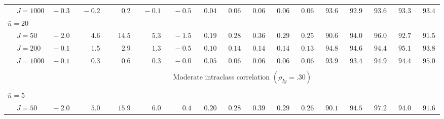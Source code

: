 \begin{sidewaystable}
\begin{threeparttable}
\begin{tabular}{llccccccccccccccc}
 & \nopagebreak $\;J=1000$  & $\phantom{0}{-}0.3\phantom{0}$ & $\phantom{0}{-}0.2\phantom{0}$ & $\phantom{0}\phantom{-}0.2\phantom{0}$ & $\phantom{0}{-}0.1\phantom{0}$ & $\phantom{0}{-}0.5\phantom{0}$ & $\phantom{0}0.04\phantom{0}$ & $\phantom{0}0.06\phantom{0}$ & $\phantom{0}0.06\phantom{0}$ & $\phantom{0}0.06\phantom{0}$ & $\phantom{0}0.06\phantom{0}$ & $\phantom{0}93.6\phantom{0}$ & $\phantom{0}92.9\phantom{0}$ & $\phantom{0}93.6\phantom{0}$ & $\phantom{0}93.3\phantom{0}$ & $\phantom{0}93.4\phantom{0}$ \\
\multicolumn{4}{l}{$\bar{n}=20$} \\  & \nopagebreak $\;J=50$  & $\phantom{0}{-}2.0\phantom{0}$ & $\phantom{0}\phantom{-}4.6\phantom{0}$ & $\phantom{-}14.5\phantom{0}$ & $\phantom{0}\phantom{-}5.3\phantom{0}$ & $\phantom{0}{-}1.5\phantom{0}$ & $\phantom{0}0.19\phantom{0}$ & $\phantom{0}0.28\phantom{0}$ & $\phantom{0}0.36\phantom{0}$ & $\phantom{0}0.29\phantom{0}$ & $\phantom{0}0.25\phantom{0}$ & $\phantom{0}90.6\phantom{0}$ & $\phantom{0}94.0\phantom{0}$ & $\phantom{0}96.0\phantom{0}$ & $\phantom{0}92.7\phantom{0}$ & $\phantom{0}91.5\phantom{0}$ \\
 & \nopagebreak $\;J=200$  & $\phantom{0}{-}0.1\phantom{0}$ & $\phantom{0}\phantom{-}1.5\phantom{0}$ & $\phantom{0}\phantom{-}2.9\phantom{0}$ & $\phantom{0}\phantom{-}1.3\phantom{0}$ & $\phantom{0}{-}0.5\phantom{0}$ & $\phantom{0}0.10\phantom{0}$ & $\phantom{0}0.14\phantom{0}$ & $\phantom{0}0.14\phantom{0}$ & $\phantom{0}0.14\phantom{0}$ & $\phantom{0}0.13\phantom{0}$ & $\phantom{0}94.8\phantom{0}$ & $\phantom{0}94.6\phantom{0}$ & $\phantom{0}94.4\phantom{0}$ & $\phantom{0}95.1\phantom{0}$ & $\phantom{0}93.8\phantom{0}$ \\
 & \nopagebreak $\;J=1000$  & $\phantom{0}{-}0.1\phantom{0}$ & $\phantom{0}\phantom{-}0.3\phantom{0}$ & $\phantom{0}\phantom{-}0.6\phantom{0}$ & $\phantom{0}\phantom{-}0.3\phantom{0}$ & $\phantom{0}{-}0.0\phantom{0}$ & $\phantom{0}0.05\phantom{0}$ & $\phantom{0}0.06\phantom{0}$ & $\phantom{0}0.06\phantom{0}$ & $\phantom{0}0.06\phantom{0}$ & $\phantom{0}0.06\phantom{0}$ & $\phantom{0}93.9\phantom{0}$ & $\phantom{0}93.4\phantom{0}$ & $\phantom{0}94.9\phantom{0}$ & $\phantom{0}94.4\phantom{0}$ & $\phantom{0}95.0\phantom{0}$ \\
[0.5ex]\hline\\[-1.6ex] 
& & \multicolumn{15}{c}{Moderate intraclass correlation $(\rho_{Iy}=.30)$} \\[0.6ex]\hline\\[-1.8ex]
\multicolumn{4}{l}{$\bar{n}=5$} \\  & \nopagebreak $\;J=50$  & $\phantom{0}{-}2.0\phantom{0}$ & $\phantom{0}\phantom{-}5.0\phantom{0}$ & $\phantom{-}15.9\phantom{0}$ & $\phantom{0}\phantom{-}6.0\phantom{0}$ & $\phantom{0}\phantom{-}0.4\phantom{0}$ & $\phantom{0}0.20\phantom{0}$ & $\phantom{0}0.28\phantom{0}$ & $\phantom{0}0.39\phantom{0}$ & $\phantom{0}0.29\phantom{0}$ & $\phantom{0}0.26\phantom{0}$ & $\phantom{0}90.1\phantom{0}$ & $\phantom{0}94.5\phantom{0}$ & $\phantom{0}97.2\phantom{0}$ & $\phantom{0}94.0\phantom{0}$ & $\phantom{0}91.6\phantom{0}$ \\

\end{tabular}
\end{threeparttable}
\end{sidewaystable}
